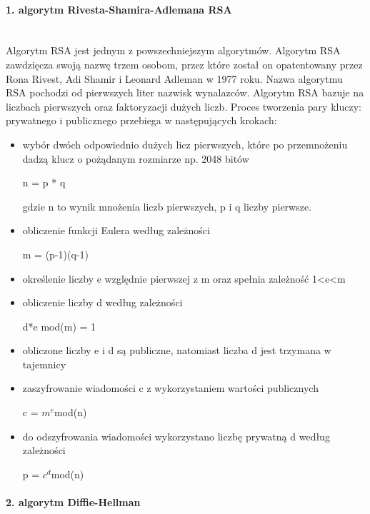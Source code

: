\documentclass[12p]{article}
\begin{document}
\paragraph{1. algorytm Rivesta-Shamira-Adlemana RSA} \mbox{} \\

Algorytm RSA jest jednym z powszechniejszym algorytmów. Algorytm RSA zawdzięcza swoją nazwę trzem osobom, przez które został on opatentowany przez Rona Rivest, Adi Shamir i Leonard Adleman w 1977 roku. Nazwa algorytmu RSA pochodzi od pierwszych liter nazwisk wynalazców. Algorytm RSA bazuje na liczbach pierwszych oraz faktoryzacji dużych liczb. Proces tworzenia pary kluczy: prywatnego i publicznego przebiega w następujących krokach:
\begin{itemize}
\item wybór dwóch odpowiednio dużych licz pierwszych, które po przemnożeniu dadzą klucz o pożądanym rozmiarze np. 2048 bitów
\begin{center}
n = p * q 
\end{center}
gdzie n to wynik mnożenia liczb pierwszych, p i q liczby pierwsze.
\item obliczenie funkcji Eulera według zależności
\begin{center}
m = (p-1)(q-1)
\end{center}
\item określenie liczby e względnie pierwszej z m oraz spełnia zależność 1<e<m
\item obliczenie liczby d według zależności
\begin{center}
d*e mod(m) = 1
\end{center}
\item obliczone liczby e i d są publiczne, natomiast liczba d jest trzymana w tajemnicy
\item zaszyfrowanie wiadomości c z wykorzystaniem wartości publicznych
\begin{center}
c = $m^{e}$mod(n)
\end{center}
\item do odszyfrowania wiadomości wykorzystano liczbę prywatną d według zależności
\begin{center}
p = $c^{d}$mod(n)
\end{center}
\end{itemize}
 
 
 
\paragraph{2. algorytm Diffie-Hellman} \mbox{} \\
\end{document}
